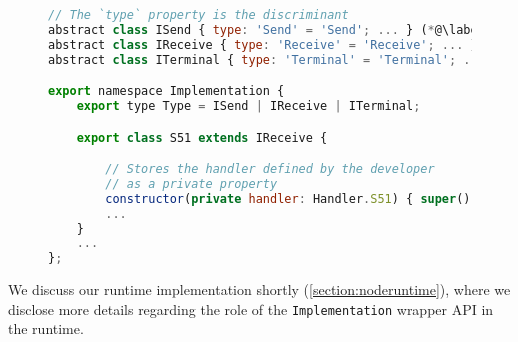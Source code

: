 \begin{figure}[!h]
\begin{lstlisting}[language=javascript,tabsize=2]
// The `type` property is the discriminant
abstract class ISend { type: 'Send' = 'Send'; ... } (*@\label{line:nodeefsmsend}@*)
abstract class IReceive { type: 'Receive' = 'Receive'; ... } (*@\label{line:nodeefsmreceive}@*)
abstract class ITerminal { type: 'Terminal' = 'Terminal'; ... } (*@\label{line:nodeefsmterminal}@*)

export namespace Implementation {
	export type Type = ISend | IReceive | ITerminal;

	export class S51 extends IReceive {

		// Stores the handler defined by the developer
		// as a private property	
		constructor(private handler: Handler.S51) { super(); }
		...
	}
	...	
};
\end{lstlisting}
\label{lst:nodeefsmimplementation}
\end{figure}

We discuss our runtime implementation shortly 
(\cref{section:noderuntime}), where we disclose more details regarding
the role of the \texttt{Implementation} wrapper API in
the runtime.